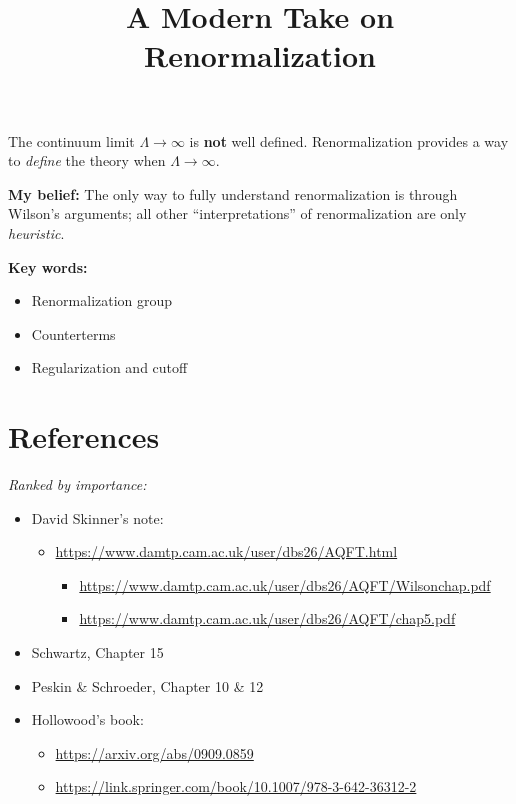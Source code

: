 \documentclass[a4paper,10pt]{article}
\title{A Modern Take on Renormalization}
\begin{document}
\maketitle
\pagestyle{headings}
\thispagestyle{empty}

\vspace*{-.5\baselineskip}
	The continuum limit $\Lambda\to\infty$ is \textbf{not} well defined.
	Renormalization provides a way to \emph{define} the theory when
	$\Lambda\to\infty$.
	
	\textbf{My belief:} The only way to fully understand renormalization is
	through Wilson's arguments; all other ``interpretations'' of
	renormalization are only \emph{heuristic}.

\textbf{Key words:}
\begin{itemize}[nosep]
\item Renormalization group
\item Counterterms
\item Regularization and cutoff
\end{itemize}


\setlength{\parskip}{.1\baselineskip}
\tableofcontents
\setlength{\parskip}{\parskipnorm}


\section{References}

\noindent \textsl{Ranked by importance:}

	\begin{itemize}
	\item David Skinner's note:
	  \begin{itemize}[nosep]
	  \item \url{https://www.damtp.cam.ac.uk/user/dbs26/AQFT.html}
	    \begin{itemize}[nosep]
	    \item \url{https://www.damtp.cam.ac.uk/user/dbs26/AQFT/Wilsonchap.pdf}
	    \item \url{https://www.damtp.cam.ac.uk/user/dbs26/AQFT/chap5.pdf}
	    \end{itemize}
	  \end{itemize}
	\item Schwartz, Chapter 15
	\item Peskin \& Schroeder, Chapter 10 \& 12
	\item Hollowood's book:
	  \begin{itemize}[nosep]
	  \item \url{https://arxiv.org/abs/0909.0859}
	  \item \url{https://link.springer.com/book/10.1007/978-3-642-36312-2}
	  \end{itemize}
	\end{itemize}
\end{document}
